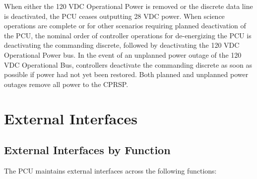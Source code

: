 \documentclass[12pt,oneside,oldfontcommands]{memoir}
\begin{document}
When either the 120 \gls{VDC} Operational Power is removed or the discrete data line is deactivated, the \gls{PCU} ceases outputting 28 \gls{VDC} power. When science operations are complete or for other scenarios requiring planned deactivation of the \gls{PCU}, the nominal order of controller operations for de-energizing the \gls{PCU} is deactivating the commanding discrete, followed by deactivating the 120 \gls{VDC} Operational Power bus. In the event of an unplanned power outage of the 120 \gls{VDC} Operational Bus, controllers deactivate the commanding discrete as soon as possible if power had not yet been restored. Both planned and unplanned power outages remove all power to the \gls{CPRSP}.

\chapter{External Interfaces  }
\label{interfaces}

\section{External Interfaces by Function}
\label{externalinterfacesbyfunction}

The \gls{PCU} maintains external interfaces across the following functions:
\end{document}
